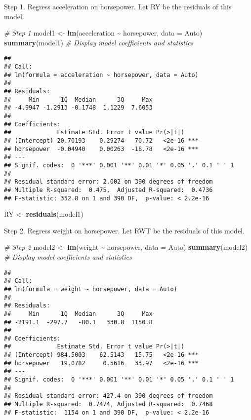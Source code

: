 \documentclass[
]{article}
\newenvironment{Shaded}{\begin{snugshade}}{\end{snugshade}}
\newcommand{\AttributeTok}[1]{\textcolor[rgb]{0.13,0.29,0.53}{#1}}
\newcommand{\CommentTok}[1]{\textcolor[rgb]{0.56,0.35,0.01}{\textit{#1}}}
\newcommand{\FunctionTok}[1]{\textcolor[rgb]{0.13,0.29,0.53}{\textbf{#1}}}
\newcommand{\NormalTok}[1]{#1}
\newcommand{\OtherTok}[1]{\textcolor[rgb]{0.56,0.35,0.01}{#1}}
\newcommand{\SpecialCharTok}[1]{\textcolor[rgb]{0.81,0.36,0.00}{\textbf{#1}}}
\begin{document}
Step 1. Regress acceleration on horsepower. Let RY be the residuals of
this model.

\begin{Shaded}
\begin{Highlighting}[]
\CommentTok{\# Step 1}
\NormalTok{model1 }\OtherTok{\textless{}{-}} \FunctionTok{lm}\NormalTok{(acceleration }\SpecialCharTok{\textasciitilde{}}\NormalTok{ horsepower, }\AttributeTok{data =}\NormalTok{ Auto)}
\FunctionTok{summary}\NormalTok{(model1)  }\CommentTok{\# Display model coefficients and statistics}
\end{Highlighting}
\end{Shaded}

\begin{verbatim}
## 
## Call:
## lm(formula = acceleration ~ horsepower, data = Auto)
## 
## Residuals:
##     Min      1Q  Median      3Q     Max 
## -4.9947 -1.2913 -0.1748  1.1229  7.6053 
## 
## Coefficients:
##             Estimate Std. Error t value Pr(>|t|)    
## (Intercept) 20.70193    0.29274   70.72   <2e-16 ***
## horsepower  -0.04940    0.00263  -18.78   <2e-16 ***
## ---
## Signif. codes:  0 '***' 0.001 '**' 0.01 '*' 0.05 '.' 0.1 ' ' 1
## 
## Residual standard error: 2.002 on 390 degrees of freedom
## Multiple R-squared:  0.475,  Adjusted R-squared:  0.4736 
## F-statistic: 352.8 on 1 and 390 DF,  p-value: < 2.2e-16
\end{verbatim}

\begin{Shaded}
\begin{Highlighting}[]
\NormalTok{RY }\OtherTok{\textless{}{-}} \FunctionTok{residuals}\NormalTok{(model1)}
\end{Highlighting}
\end{Shaded}

Step 2. Regress weight on horsepower. Let RWT be the residuals of this
model.

\begin{Shaded}
\begin{Highlighting}[]
\CommentTok{\# Step 2}
\NormalTok{model2 }\OtherTok{\textless{}{-}} \FunctionTok{lm}\NormalTok{(weight }\SpecialCharTok{\textasciitilde{}}\NormalTok{ horsepower, }\AttributeTok{data =}\NormalTok{ Auto)}
\FunctionTok{summary}\NormalTok{(model2)  }\CommentTok{\# Display model coefficients and statistics}
\end{Highlighting}
\end{Shaded}

\begin{verbatim}
## 
## Call:
## lm(formula = weight ~ horsepower, data = Auto)
## 
## Residuals:
##     Min      1Q  Median      3Q     Max 
## -2191.1  -297.7   -80.1   330.8  1150.8 
## 
## Coefficients:
##             Estimate Std. Error t value Pr(>|t|)    
## (Intercept) 984.5003    62.5143   15.75   <2e-16 ***
## horsepower   19.0782     0.5616   33.97   <2e-16 ***
## ---
## Signif. codes:  0 '***' 0.001 '**' 0.01 '*' 0.05 '.' 0.1 ' ' 1
## 
## Residual standard error: 427.4 on 390 degrees of freedom
## Multiple R-squared:  0.7474, Adjusted R-squared:  0.7468 
## F-statistic:  1154 on 1 and 390 DF,  p-value: < 2.2e-16
\end{verbatim}
\end{document}
